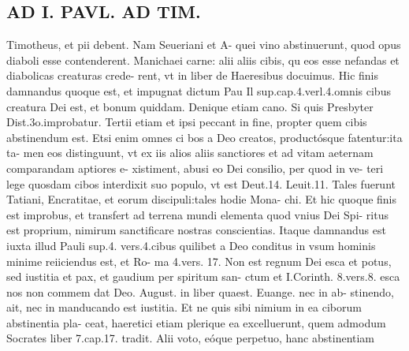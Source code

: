\documentclass{article}
\begin{document}
\begin{pages}
\section*{AD I. PAVL. AD TIM. }
\marginpar{[ p.374 ]}\pstart Timotheus, et pii debent. Nam Seueriani et A- quei vino abstinuerunt, quod opus diaboli esse contenderent. Manichaei carne: alii aliis cibis, qu eos esse nefandas et diabolicas creaturas crede- rent, vt in liber  de Haeresibus docuimus. Hic finis damnandus quoque est, et impugnat dictum Pau Il sup.cap.4.verl.4.omnis cibus creatura Dei est, et bonum quiddam. Denique etiam cano. Si quis Presbyter Dist.3o.improbatur.  \pend\pstart Tertii etiam et ipsi peccant in fine, propter quem cibis abstinendum est. Etsi enim omnes ci bos a Deo creatos, productósque fatentur:ita ta- men eos distinguunt, vt ex iis alios aliis sanctiores et ad vitam aeternam comparandam aptiores e- xistiment, abusi eo Dei consilio, per quod in ve- teri lege quosdam cibos interdixit suo populo, vt est Deut.14. Leuit.11. Tales fuerunt Tatiani, Encratitae, et eorum discipuli:tales hodie Mona- chi. Et hic quoque finis est improbus, et transfert ad terrena mundi elementa quod vnius Dei Spi- ritus est proprium, nimirum sanctificare nostras conscientias. Itaque damnandus est iuxta illud Pauli sup.4. vers.4.cibus quilibet a Deo conditus in vsum hominis minime reiiciendus est, et Ro- ma 4.vers. 17. Non est regnum Dei esca et potus, sed iustitia et pax, et gaudium per spiritum san- ctum et I.Corinth. 8.vers.8. esca nos non commem dat Deo. August. in liber  quaest. Euange. nec in ab- stinendo, ait, nec in manducando est iustitia. Et ne quis sibi nimium in ea ciborum abstinentia pla- ceat, haeretici etiam plerique ea excelluerunt, quem admodum Socrates liber 7.cap.17. tradit.  \pend\pstart Alii voto, eóque perpetuo, hanc abstinentiam  \pend

\end{pages}
\end{document}
